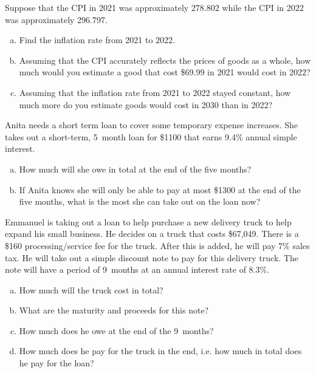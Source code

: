 \documentclass[11pt,letterpaper]{article}
\begin{document}

 Suppose that the CPI in 2021 was approximately 278.802 while the CPI in 2022 was approximately 296.797. 
	\begin{enumerate}[(a)]
	\item Find the inflation rate from 2021 to 2022. 
	\item Assuming that the CPI accurately reflects the prices of goods as a whole, how much would you estimate a good that cost \$69.99 in 2021 would cost in 2022?
	\item Assuming that the inflation rate from 2021 to 2022 stayed constant, how much more do you estimate goods would cost in 2030 than in 2022?
	\end{enumerate}



\newpage



 Anita needs a short term loan to cover some temporary expense increases. She takes out a short-term, 5~month loan for \$1100 that earns 9.4\% annual simple interest. 
	\begin{enumerate}[(a)]
	\item How much will she owe in total at the end of the five months?
	\item If Anita knows she will only be able to pay at most \$1300 at the end of the five months, what is the most she can take out on the loan now?
	\end{enumerate}



\newpage



 Emmanuel is taking out a loan to help purchase a new delivery truck to help expand his small business. He decides on a truck that costs \$67,049. There is a \$160 processing/service fee for the truck. After this is added, he will pay 7\% sales tax. He will take out a simple discount note to pay for this delivery truck. The note will have a period of 9~months at an annual interest rate of 8.3\%.
	\begin{enumerate}[(a)]
	\item How much will the truck cost in total?
	\item What are the maturity and proceeds for this note?
	\item How much does he owe at the end of the 9~months?
	\item How much does he pay for the truck in the end, i.e. how much in total does he pay for the loan?
	\end{enumerate}
\end{document}
